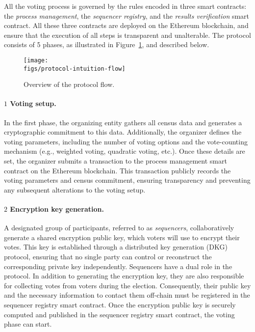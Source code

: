 
All the voting process is governed by the rules encoded in three smart contracts: the \textit{process management}, the \textit{sequencer registry}, and the \textit{results verification} smart contract. All these three contracts are deployed on the Ethereum blockchain, and ensure that the execution of all steps is transparent and unalterable. The protocol consists of 5 phases, as illustrated in Figure~\ref{fig:protocol-intuition}, and described below.\\

\begin{figure}[h]	
	\centerline{\texttt{[image: \\figs/protocol-intuition-flow]}}
	\caption{Overview of the protocol flow.}
	\label{fig:protocol-intuition}
\end{figure}


\paragraph{$\boxed{1}$ Voting setup.}

In the first phase, the organizing entity gathers all census data and generates a cryptographic commitment to this data. %
Additionally, the organizer defines the voting parameters, including the number of voting options and the vote-counting mechanism (e.g., weighted voting, quadratic voting, etc.). Once these details are set, the organizer submits a transaction to the process management smart contract on the Ethereum blockchain. This transaction publicly records the voting parameters and census commitment, ensuring transparency and preventing any subsequent alterations to the voting setup.

\paragraph{$\boxed{2}$ Encryption key generation.}

A designated group of participants, referred to as \textit{sequencers}, collaboratively generate a shared encryption public key, which voters will use to encrypt their votes. This key is established through a distributed key generation (DKG) protocol, ensuring that no single party can control or reconstruct the corresponding private key independently. 
Sequencers have a dual role in the protocol. In addition to generating the encryption key, they are also responsible for collecting votes from voters during the election. Consequently, their public key and the necessary information to contact them off-chain must be registered in the sequencer registry smart contract. Once the encryption public key is securely computed and published in the sequencer registry smart contract, the voting phase can start.

